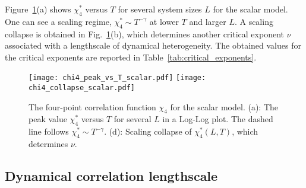 \documentclass[pre,twocolumn,superscriptaddress,tightenlines,showpacs,longbibliography,floatfix,footinbib]{revtex4-1}
\begin{document}
Figure~\ref{fig:scalar_finite_T}(a) shows $\chi_4^*$ versus $T$ for several system sizes $L$ for the scalar model.
One can see a scaling regime, $\chi_4^* \sim T^{-\gamma}$ at lower $T$ and larger $L$.
A scaling collapse is obtained in Fig.~\ref{fig:scalar_finite_T}(b), which determines another critical exponent $\nu$ associated with a lengthscale of dynamical heterogeneity.
The obtained values for the critical exponents are reported in Table~\ref{tab:critical_exponents}.

\begin{figure}
\centering
\texttt{[image: chi4\_peak\_vs\_T\_scalar.pdf]}
\texttt{[image: chi4\_collapse\_scalar.pdf]}
\caption{The four-point correlation function $\chi_4$ for the scalar model. (a): The peak value $\chi_4^*$ versus $T$ for several $L$ in a Log-Log plot. The dashed line follows $\chi_4^* \sim T^{-\gamma}$. (d): Scaling collapse of $\chi_4^*(L,T)$, which determines $\nu$. 
}
\label{fig:scalar_finite_T}
\end{figure}


\subsection{Dynamical correlation lengthscale}
\end{document}
